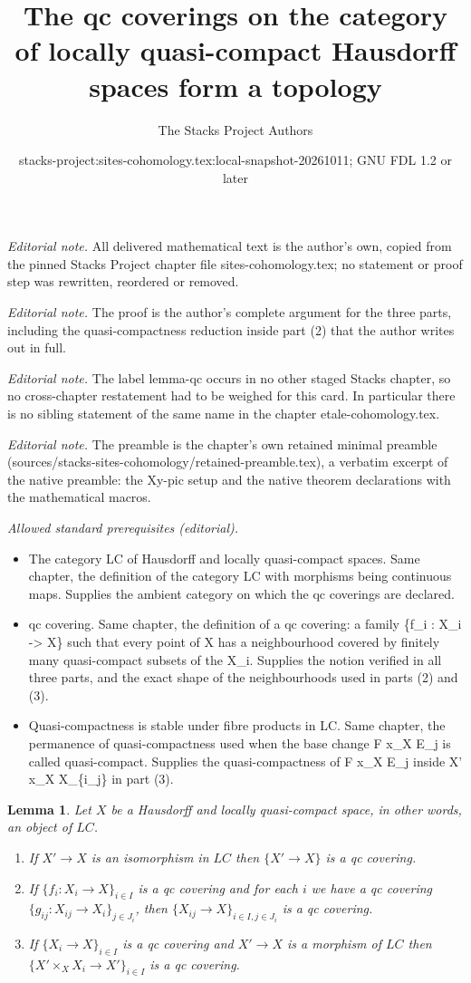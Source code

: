 \documentclass[10pt,a4paper]{amsart}
\title{The qc coverings on the category of locally quasi-compact Hausdorff spaces form a topology}
\author{The Stacks Project Authors}
\date{stacks-project:sites-cohomology.tex:local-snapshot-20261011; GNU FDL 1.2 or later}
\theoremstyle{plain}
\newtheorem{lemma}[subsection]{Lemma}
\theoremstyle{definition}
\theoremstyle{remark}
\numberwithin{equation}{subsection}
\begin{document}
\maketitle
\noindent\textit{Editorial note.} All delivered mathematical text is the author's own, copied from the pinned Stacks Project chapter file sites-cohomology.tex; no statement or proof step was rewritten, reordered or removed.\par\medskip
\noindent\textit{Editorial note.} The proof is the author's complete argument for the three parts, including the quasi-compactness reduction inside part (2) that the author writes out in full.\par\medskip
\noindent\textit{Editorial note.} The label lemma-qc occurs in no other staged Stacks chapter, so no cross-chapter restatement had to be weighed for this card. In particular there is no sibling statement of the same name in the chapter etale-cohomology.tex.\par\medskip
\noindent\textit{Editorial note.} The preamble is the chapter's own retained minimal preamble (sources/stacks-sites-cohomology/retained-preamble.tex), a verbatim excerpt of the native preamble: the Xy-pic setup and the native theorem declarations with the mathematical macros.\par\medskip
\noindent\textit{Allowed standard prerequisites (editorial).}\begin{itemize}
\item The category LC of Hausdorff and locally quasi-compact spaces. Same chapter, the definition of the category LC with morphisms being continuous maps. Supplies the ambient category on which the qc coverings are declared.
\item qc covering. Same chapter, the definition of a qc covering: a family \{f\_i : X\_i -> X\} such that every point of X has a neighbourhood covered by finitely many quasi-compact subsets of the X\_i. Supplies the notion verified in all three parts, and the exact shape of the neighbourhoods used in parts (2) and (3).
\item Quasi-compactness is stable under fibre products in LC. Same chapter, the permanence of quasi-compactness used when the base change F x\_X E\_j is called quasi-compact. Supplies the quasi-compactness of F x\_X E\_j inside X' x\_X X\_\{i\_j\} in part (3).
\end{itemize}\medskip
\begin{lemma}
\label{lemma-qc}
Let $X$ be a Hausdorff and locally quasi-compact space, in other words,
an object of $\textit{LC}$.
\begin{enumerate}
\item If $X' \to X$ is an isomorphism in $\textit{LC}$ then
$\{X' \to X\}$ is a qc covering.
\item If $\{f_i : X_i \to X\}_{i\in I}$ is a qc covering and for each
$i$ we have a qc covering $\{g_{ij} : X_{ij} \to X_i\}_{j\in J_i}$, then
$\{X_{ij} \to X\}_{i \in I, j\in J_i}$ is a qc covering.
\item If $\{X_i \to X\}_{i\in I}$ is a qc covering
and $X' \to X$ is a morphism of $\textit{LC}$ then
$\{X' \times_X X_i \to X'\}_{i\in I}$ is a qc covering.
\end{enumerate}
\end{lemma}
\end{document}
